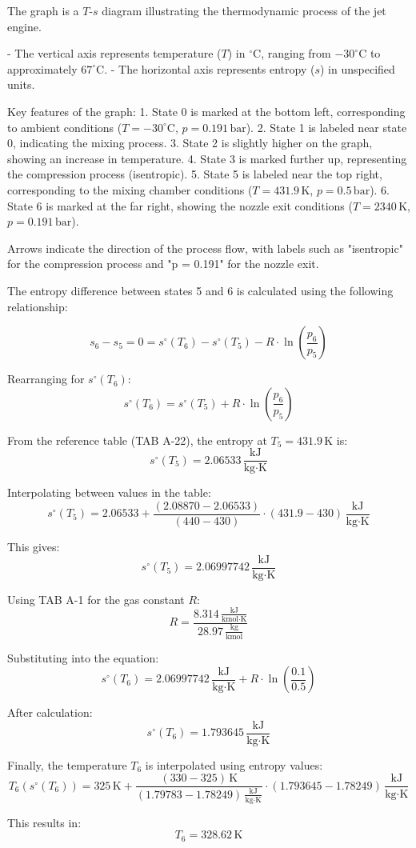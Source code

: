The graph is a \( T \)-\( s \) diagram illustrating the thermodynamic process of the jet engine.  

- The vertical axis represents temperature (\( T \)) in \( ^\circ\text{C} \), ranging from \( -30^\circ\text{C} \) to approximately \( 67^\circ\text{C} \).  
- The horizontal axis represents entropy (\( s \)) in unspecified units.  

Key features of the graph:  
1. State 0 is marked at the bottom left, corresponding to ambient conditions (\( T = -30^\circ\text{C} \), \( p = 0.191 \, \text{bar} \)).  
2. State 1 is labeled near state 0, indicating the mixing process.  
3. State 2 is slightly higher on the graph, showing an increase in temperature.  
4. State 3 is marked further up, representing the compression process (isentropic).  
5. State 5 is labeled near the top right, corresponding to the mixing chamber conditions (\( T = 431.9 \, \text{K} \), \( p = 0.5 \, \text{bar} \)).  
6. State 6 is marked at the far right, showing the nozzle exit conditions (\( T = 2340 \, \text{K} \), \( p = 0.191 \, \text{bar} \)).  

Arrows indicate the direction of the process flow, with labels such as "isentropic" for the compression process and "p = 0.191" for the nozzle exit.

The entropy difference between states 5 and 6 is calculated using the following relationship:  

\[
s_6 - s_5 = 0 = s^\circ(T_6) - s^\circ(T_5) - R \cdot \ln\left(\frac{p_6}{p_5}\right)
\]

Rearranging for \( s^\circ(T_6) \):  
\[
s^\circ(T_6) = s^\circ(T_5) + R \cdot \ln\left(\frac{p_6}{p_5}\right)
\]

From the reference table (TAB A-22), the entropy at \( T_5 = 431.9 \, \text{K} \) is:  
\[
s^\circ(T_5) = 2.06533 \, \frac{\text{kJ}}{\text{kg·K}}
\]

Interpolating between values in the table:  
\[
s^\circ(T_5) = 2.06533 + \frac{(2.08870 - 2.06533)}{(440 - 430)} \cdot (431.9 - 430) \, \frac{\text{kJ}}{\text{kg·K}}
\]

This gives:  
\[
s^\circ(T_5) = 2.06997742 \, \frac{\text{kJ}}{\text{kg·K}}
\]

Using TAB A-1 for the gas constant \( R \):  
\[
R = \frac{8.314 \, \frac{\text{kJ}}{\text{kmol·K}}}{28.97 \, \frac{\text{kg}}{\text{kmol}}}
\]

Substituting into the equation:  
\[
s^\circ(T_6) = 2.06997742 \, \frac{\text{kJ}}{\text{kg·K}} + R \cdot \ln\left(\frac{0.1}{0.5}\right)
\]

After calculation:  
\[
s^\circ(T_6) = 1.793645 \, \frac{\text{kJ}}{\text{kg·K}}
\]

Finally, the temperature \( T_6 \) is interpolated using entropy values:  
\[
T_6(s^\circ(T_6)) = 325 \, \text{K} + \frac{(330 - 325) \, \text{K}}{(1.79783 - 1.78249) \, \frac{\text{kJ}}{\text{kg·K}}} \cdot (1.793645 - 1.78249) \, \frac{\text{kJ}}{\text{kg·K}}
\]

This results in:  
\[
T_6 = 328.62 \, \text{K}
\]